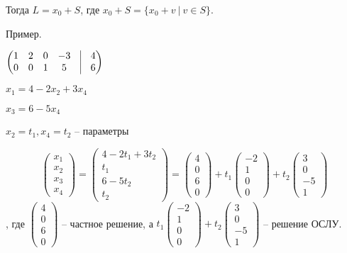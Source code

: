 Тогда $L = x_0 + S$, где $x_0 + S = \{ x_0 + v \ | \ v \in S \}$.

\vspace{\baselineskip}
Пример.

\vspace{\baselineskip}
$\begin{pmatrix} 1 & 2 & 0 & -3 & \vline & 4 \\ 0 & 0 & 1 & 5 & \vline & 6 \end{pmatrix}$

\vspace{\baselineskip}
$x_1 = 4 - 2x_2 + 3x_4$

$x_3 = 6 - 5x_4$

$x_2 = t_1, x_4 = t_2$ -- параметры

\begin{equation*} \begin{pmatrix} x_1 \\ x_2 \\ x_3 \\ x_4 \end{pmatrix} = \begin{pmatrix} 4 - 2t_1 + 3t_2 \\ t_1 \\ 6 - 5t_2 \\ t_2 \end{pmatrix} = \begin{pmatrix} 4 \\ 0 \\ 6 \\ 0 \end{pmatrix} + t_1 \begin{pmatrix} -2 \\ 1 \\ 0 \\ 0 \end{pmatrix} + t_2 \begin{pmatrix} 3 \\ 0 \\ -5 \\ 1 \end{pmatrix} \end{equation*}, где $\begin{pmatrix} 4 \\ 0 \\ 6 \\ 0 \end{pmatrix}$ -- частное решение, а $ t_1 \begin{pmatrix} -2 \\ 1 \\ 0 \\ 0 \end{pmatrix} + t_2 \begin{pmatrix} 3 \\ 0 \\ -5 \\ 1 \end{pmatrix} $ -- решение ОСЛУ.

